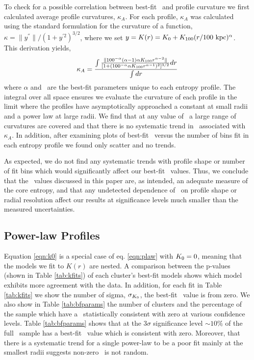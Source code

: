 \documentclass[12pt,preprint]{aastex}
\begin{document}
To check for a possible correlation between best-fit \kna\ and profile
curvature we first calculated average profile curvatures,
$\kappa_A$. For each profile, $\kappa_A$ was calculated using the
standard formulation for the curvature of a function, $\kappa =
\|y^{''}\|/(1+y^{'2})^{3/2}$, where we set $y = K(r) =
K_0+K_{100}(r/100\mbox{\ensuremath{\mathrm{~kpc}}})^{\alpha}$. This derivation yields,
\begin{equation}
\kappa_A = \frac{\int\frac{\| 100^{-\alpha} (\alpha-1) \alpha K_{100}
  r^{\alpha-2}\|}{[1+(100^{-\alpha} \alpha K_{100}
    r^{\alpha-1})^2]^{3/2}} dr}{\int dr}
\end{equation}
where $\alpha$ and \khun\ are the best-fit parameters unique to each
entropy profile. The integral over all space ensures we evaluate the
curvature of each profile in the limit where the profiles have
asymptotically approached a constant at small radii and a power law at
large radii. We find that at any value of \kna\ a large range of
curvatures are covered and that there is no systematic trend in
\kna\ associated with $\kappa_A$. In addition, after examining plots
of best-fit \kna\ versus the number of bins fit in each entropy
profile we found only scatter and no trends.

As expected, we do not find any systematic trends with profile shape
or number of fit bins which would significantly affect our best-fit
\kna\ values. Thus, we conclude that the \kna\ values discussed in
this paper are, as intended, an adequate measure of the core entropy,
and that any undetected dependence of \kna\ on profile shape or radial
resolution affect our results at significance levels much smaller than
the measured uncertainties.

\subsection{Power-law Profiles}
\label{sec:quality}

Equation \ref{eqn:k0} is a special case of eq. \ref{eqn:plaw} with
$K_0 = 0$, meaning that the models we fit to $K(r)$ are nested. A
comparison between the p-values (shown in Table \ref{tab:kfits}) of
each cluster's best-fit models shows which model exhibits more
agreement with the data. In addition, for each fit in Table
\ref{tab:kfits} we show the number of sigma, $\sigma_{K_0}$, the
best-fit \kna\ value is from zero. We also show in Table
\ref{tab:bfparams} the number of clusters and the percentage of the
sample which have a \kna\ statistically consistent with zero at
various confidence levels. Table \ref{tab:bfparams} shows that at the
$3\sigma$ significance level $\sim10\%$ of the full \accept\ sample
has a best-fit \kna\ value which is consistent with zero. Moreover,
that there is a systematic trend for a single power-law to be a poor
fit mainly at the smallest radii suggests non-zero \kna\ is not
random.
\end{document}
